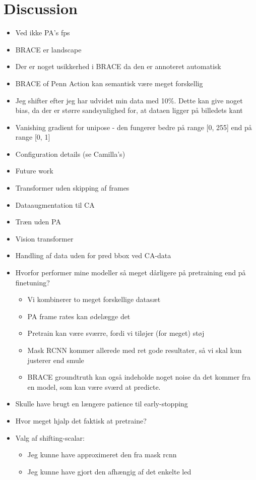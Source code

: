 \documentclass[./main.tex]{subfiles}
\begin{document}
\section{Discussion}
\begin{itemize}
    \item Ved ikke PA's fps
    \item BRACE er landscape
    \item Der er noget usikkerhed i BRACE da den er annoteret automatisk
    \item BRACE of Penn Action kan semantisk være meget forskellig
    \item Jeg shifter efter jeg har udvidet min data med 10\%. Dette kan give noget bias, da der er større sandsynlighed for, at dataen ligger på billedets kant
    \item Vanishing gradient for unipose - den fungerer bedre på range [0, 255] end på range [0, 1]
    \item Configuration details (se Camilla's)
    \item Future work
        \item Transformer uden skipping af frames 
        \item Dataaugmentation til CA
        \item Træn uden PA
        \item Vision transformer
    \item Handling af data uden for pred bbox ved CA-data
    \item Hvorfor performer mine modeller så meget dårligere på pretraining end på finetuning?
    \begin{itemize}
        \item Vi kombinerer to meget forskellige datasæt
        \item PA frame rates kan ødelægge det
        \item Pretrain kan være sværre, fordi vi tiløjer (for meget) støj
        \item Mask RCNN kommer allerede med ret gode resultater, så vi skal kun justerer end smule
        \item BRACE groundtruth kan også indeholde noget noise da det kommer fra en model, som kan være sværd at predicte.
    \end{itemize}
    \item Skulle have brugt en længere patience til early-stopping
    \item Hvor meget hjalp det faktisk at pretraine?
    \item Valg af shifting-scalar:
    \begin{itemize}
        \item Jeg kunne have approximeret den fra mask rcnn
        \item Jeg kunne have gjort den afhængig af det enkelte led
    \end{itemize}
\end{itemize}
\end{document}
